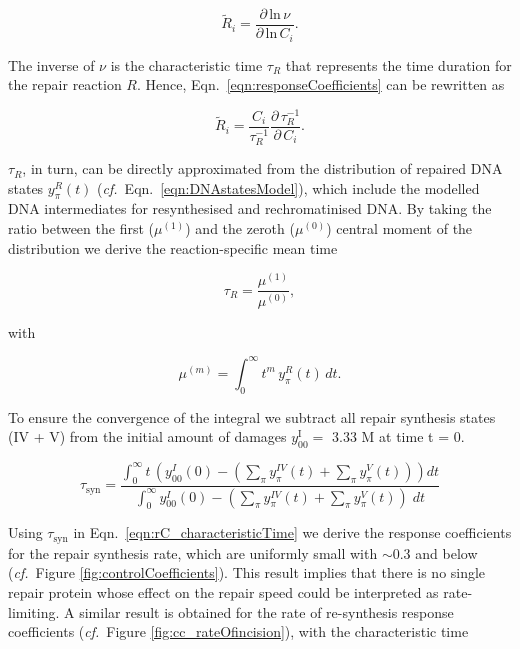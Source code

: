 \begin{equation}
\tilde{R}_i = \frac{\partial \, \text{ln} \, \nu}{\partial \, \text{ln} \, C_i}.
\label{eqn:responseCoefficients}
\end{equation}

The inverse of $\nu$ is the characteristic time $\tau_R$ that represents the time duration for the repair reaction $R$. Hence, Eqn.\ \ref{eqn:responseCoefficients} can be rewritten as

\begin{equation}
\tilde{R}_i = \frac{C_i}{\tau_R^{-1}} \frac{\partial  \, \tau_R^{-1}}{\partial \,  C_i}.
\label{eqn:rC_characteristicTime}   
\end{equation}

$\tau_R$, in turn, can be directly approximated from the distribution of repaired DNA states $y^R_\pi(t)$ (\textit{cf.}\ Eqn.\ \ref{eqn:DNAstatesModel}), which include the modelled DNA intermediates for resynthesised and rechromatinised DNA. By taking the ratio between the first ($\mu^{(1)}$) and the zeroth ($\mu^{(0)}$) central moment of the distribution we derive the reaction-specific mean time 

\begin{equation}
\tau_{R} = \frac{\mu^{(1)}}{\mu^{(0)}}, 
\label{eqn:meanreactiontime}   
\end{equation}

with

\begin{equation}
\mu^{(m)} = \int_0^\infty t^m \, y^R_\pi(t)\, dt.
\label{eqn:moments}   
\end{equation}


To ensure the convergence of the integral we subtract all repair synthesis states (IV + V) from the initial amount of damages $y^{\text{I}}_{00} = $ 3.33 \textmu M at time t = 0.

\begin{equation}	
\tau_{\text{syn}}=\frac{\int_0^\infty t \, (y^I_{00}(0)-( \sum_ \pi  y_\pi^{IV}(t)+\sum_ \pi  y_\pi^{V}(t))) dt}{\int_0^\infty y^I_{00}(0)-( \sum_ \pi  y_\pi^{IV}(t)+\sum_ \pi  y_\pi^{V}(t))\; dt}
\end{equation}

Using $\tau_{\text{syn}}$ in Eqn.\ \ref{eqn:rC_characteristicTime} we derive the response coefficients for the repair synthesis rate, which are uniformly small with $\sim$0.3 and below (\textit{cf.}\ Figure \ref{fig:controlCoefficients}). This result implies that there is no single repair protein whose effect on the repair speed could be interpreted as rate-limiting. A similar result is obtained for the rate of re-synthesis response coefficients (\textit{cf.}\ Figure \ref{fig:cc_rateOfincision}), with the characteristic time

